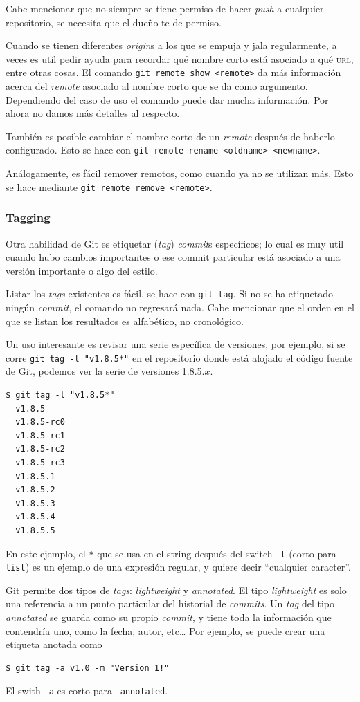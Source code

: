 \documentclass[spanish, 12pt, a4paper]{article}
\begin{document}
Cabe mencionar que no siempre se tiene permiso de hacer \textit{push} a cualquier repositorio, se necesita que el dueño te de permiso.

Cuando se tienen diferentes \textit{origin}s a los que se empuja y jala regularmente, a veces es util pedir ayuda para recordar qué nombre corto está asociado a qué \textsc{url}, entre otras cosas.
El comando \texttt{git remote show <remote>} da más información acerca del \textit{remote} asociado al nombre corto que se da como argumento.
Dependiendo del caso de uso el comando puede dar mucha información.
Por ahora no damos más detalles al respecto.

También es posible cambiar el nombre corto de un \textit{remote} después de haberlo configurado.
Esto se hace con \texttt{git remote rename <oldname> <newname>}.

Análogamente, es fácil remover remotos, como cuando ya no se utilizan más.
Esto se hace mediante \texttt{git remote remove <remote>}.

\subsubsection{Tagging}
Otra habilidad de Git es etiquetar (\textit{tag}) \textit{commit}s específicos; lo cual es muy util cuando hubo cambios importantes o ese commit particular está asociado a una versión importante o algo del estilo.

Listar los \textit{tags} existentes es fácil, se hace con \texttt{git tag}.
Si no se ha etiquetado ningún \textit{commit}, el comando no regresará nada.
Cabe mencionar que el orden en el que se listan los resultados es alfabético, no cronológico.

Un uso interesante es revisar una serie específica de versiones, por ejemplo, si se corre \texttt{git tag -l "v1.8.5*"} en el repositorio donde está alojado el código fuente de Git, podemos ver la serie de versiones 1.8.5.$x$.
\begin{lstlisting}
$ git tag -l "v1.8.5*"
  v1.8.5
  v1.8.5-rc0
  v1.8.5-rc1
  v1.8.5-rc2
  v1.8.5-rc3
  v1.8.5.1
  v1.8.5.2
  v1.8.5.3
  v1.8.5.4
  v1.8.5.5
\end{lstlisting}
En este ejemplo, el \texttt{*} que se usa en el string después del switch \texttt{-l} (corto para \texttt{--list}) es un ejemplo de una expresión regular, y quiere decir ``cualquier caracter''.

Git permite dos tipos de \textit{tags}: \textit{lightweight} y \textit{annotated}.
El tipo \textit{lightweight} es solo una referencia a un punto particular del historial de \textit{commits}.
Un \textit{tag} del tipo \textit{annotated} se guarda como su propio \textit{commit}, y tiene toda la información que contendría uno, como la fecha, autor, etc\dots
Por ejemplo, se puede crear una etiqueta anotada como
\begin{lstlisting}
$ git tag -a v1.0 -m "Version 1!"
\end{lstlisting}
El swith \texttt{-a} es corto para \texttt{--annotated}.
\end{document}
